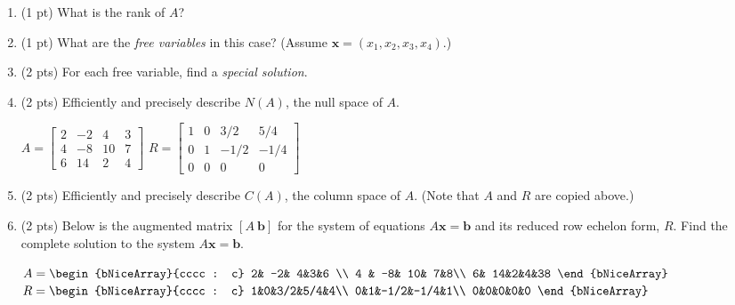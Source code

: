 \documentclass[11pt,fleqn]{article}
\def\bbm{\begin{bmatrix}}
\def\ebm{\end{bmatrix}}
\begin{document}
	\begin{enumerate}
	\item (1 pt) What is the rank of $A$?\\
	\item (1 pt) What are the \emph{free variables} in this case? (Assume $\mathbf{x} = (x_1,x_2,x_3,x_4).$)\\
	\item (2 pts) For each free variable, find a \emph{special solution}.
	\vfill
	\item (2 pts) Efficiently and precisely describe $N(A)$, the null space of $A$.
	\vfill
	\newpage
	\thispagestyle{empty}
	\begin{center}
$A=\bbm 2& -2& 4&3 \\
4 & -8& 10& 7\\
6& 14&2&4 \ebm$
\hspace{.3in}
$R= \bbm 1&0&3/2&5/4\\
0&1&-1/2&-1/4\\
0&0&0&0 \ebm$
\end{center}
	\item (2 pts) Efficiently and precisely describe $C(A)$, the column space of $A$. (Note that $A$ and $R$ are copied above.)
	\vfill
	\item (2 pts) Below is the augmented matrix $[A \: \mathbf{b}]$ for the system of equations $A\mathbf{x}=\mathbf{b}$ and its reduced row echelon form, $R$. Find the complete solution to the system $A\mathbf{x}=\mathbf{b}$.
	\begin{center}
$A=\begin{bNiceArray}{cccc : c}
 2& -2& 4&3&6 \\
4 & -8& 10& 7&8\\
6& 14&2&4&38 \end{bNiceArray}$
\hspace{.3in}
$R= \begin{bNiceArray}{cccc : c}
1&0&3/2&5/4&4\\
0&1&-1/2&-1/4&1\\
0&0&0&0&0 
\end{bNiceArray}$
\end{center}
	
	\end{enumerate}
\vfill
\end{document}

